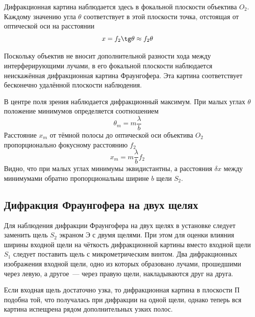 Дифракционная картина наблюдается здесь в фокальной плоскости объектива $O_{2}$. Каждому значению угла $ \theta$ соответствует в этой плоскости точка, отстоящая от оптической оси на расстоянии
\[
    x = f_{2} \tg \theta \approx f_{2} \theta
\]

Поскольку объектив не вносит дополнительной разности хода между интерферирующими лучами,  в его фокальной плоскости наблюдается неискажённая дифракционная картина Фраунгофера. Эта картина соответствует бесконечно удалённой плоскости наблюдения.

В центре поля зрения наблюдается дифракционный максимум. При малых углах $\theta$ положение минимумов определяется  соотношением
\[
    \theta_{m} = m\frac{\lambda}{b}
\]
Расстояние $x_{m}$ от тёмной полосы до оптической оси объектива $O_{2}$ пропорционально фокусному расстоянию $f_{2}$
\[
    x_{m} = m\frac{\lambda}{b}f_{2}
\]
Видно, что при малых углах минимумы эквидистантны, а расстояния $\delta x$ между минимумами обратно пропорциональны ширине $b$ щели $S_{2}$.

\subsection{Дифракция Фраунгофера на двух щелях}
Для наблюдения дифракции Фраунгофера на двух щелях в установке следует заменить щель $S_{2}$ экраном Э с двумя щелями. При этом для оценки влияния ширины входной щели на чёткость дифракционной картины вместо входной щели $S_{1}$ следует поставить щель с микрометрическим винтом. Два дифракционных изображения входной щели, одно из которых образовано лучами, прошедшими через левую, а другое~--- через правую щели, накладываются друг на друга.

\begin{figure}[ht!]
\end{figure}

Если входная щель достаточно узка, то дифракционная картина в плоскости П подобна той, что получалась при дифракции на одной щели, однако теперь вся картина испещрена рядом дополнительных узких полос.

